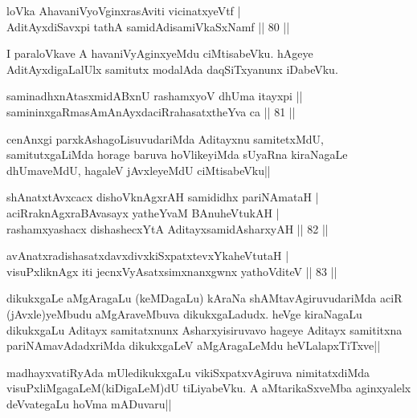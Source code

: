 \begin{shl}
loVka AhavaniVyoV\s ginxrasAviti vicinatxyeVtf | \\
AditAyxdiSavxpi tathA samidAdisamiVkaSxNamf \hfill|| 80 || 
\end{shl}

\begin{artha}
I paraloVkave A havaniVyAginxyeMdu ciMtisabeVku. hAgeye 
AditAyxdigaLalUlx samitutx modalAda daqSiTxyanunx iDabeVku.
\end{artha}

\begin{shl}
saminadhxnAtasxmidABxnU rashamxyoV dhUma itayxpi || \\
samininxgaRmasAmAnAyxdaciRrahasatxtheYva ca \hfill|| 81 || 
\end{shl}

\begin{artha}
cenAnxgi parxkAshagoLisuvudariMda Aditayxnu samitetxMdU, 
samitutxgaLiMda horage baruva hoVlikeyiMda sUyaRna kiraNagaLe 
dhUmaveMdU, hagaleV jAvxleyeMdU ciMtisabeVku||
\end{artha}

\begin{shl}
shAnatxtAvxcacx dishoV\s knAgxrAH samididhx pariNAmataH | \\
aciRraknAgxraBAvasayx yatheYvaM BAnuheVtukAH | \\
rashamxyashacx dishashecxYtA AditayxsamidAsharxyAH \hfill|| 82 || 
\end{shl}

\begin{shl}
avAnatxradishasatxdavxdivxkiSxpatxtevxYkaheVtutaH | \\
visuPxliknAgx iti jecnxVyAsatxsimxnanxgwnx yathoVditeV \hfill|| 83 || 
\end{shl}

\begin{artha}
dikukxgaLe aMgAragaLu (keMDagaLu) kAraNa shAMtavAgiruvudariMda aciR 
(jAvxle)yeMbudu aMgAraveMbuva dikukxgaLadudx. heVge kiraNagaLu 
dikukxgaLu Aditayx samitatxnunx Asharxyisiruvavo hageye Aditayx 
samititxna pariNAmavAdadxriMda dikukxgaLeV aMgAragaLeMdu 
heVLalapxTiTxve||
\end{artha}

\begin{artha}
madhayxvatiRyAda mUledikukxgaLu vikiSxpatxvAgiruva nimitatxdiMda 
visuPxliMgagaLeM(kiDigaLeM)dU tiLiyabeVku. A aMtarikaSxveMba 
aginxyalelx deVvategaLu hoVma mADuvaru|| 
\end{artha}

